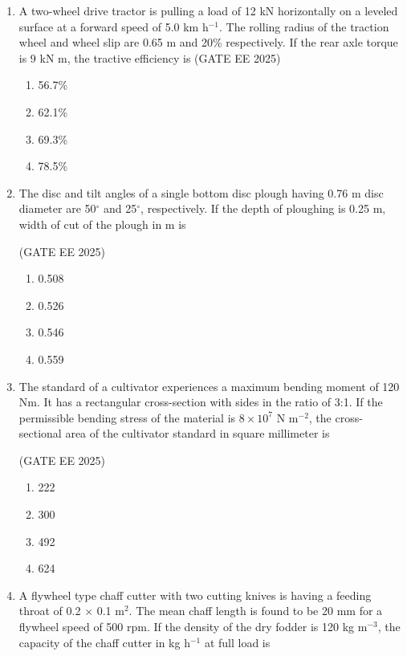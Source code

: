 \documentclass[journal,12pt,onecolumn]{IEEEtran}
\theoremstyle{remark}
\begin{document}
\begin{enumerate}
\item A two-wheel drive tractor is pulling a load of 12 kN horizontally on a leveled surface at a forward speed of 5.0 km h$^{-1}$. The rolling radius of the traction wheel and wheel slip are 0.65 m and 20\% respectively. If the rear axle torque is 9 kN m, the tractive efficiency is
\hfill(GATE EE 2025)
\begin{multicols}{4}
\begin{enumerate}
    \item 56.7\%
    \item 62.1\%
    \item 69.3\%
    \item 78.5\%
\end{enumerate}
\end{multicols}
\newpage
\item The disc and tilt angles of a single bottom disc plough having 0.76 m disc diameter are 50$^\circ$ and 25$^\circ$, respectively. If the depth of ploughing is 0.25 m, width of cut
of the plough in m is

\hfill(GATE EE 2025)

\begin{multicols}{4}
\begin{enumerate}
    \item 0.508
    \item 0.526
    \item 0.546
    \item 0.559
\end{enumerate}
\end{multicols}

\item The standard of a cultivator experiences a maximum bending moment of 120 Nm. It has a rectangular cross-section with sides in the ratio of 3:1. If the permissible bending stress of the material is $8 \times 10^{7}$ N m$^{-2}$, the cross-sectional area of the cultivator standard in square millimeter is

\hfill(GATE EE 2025)

\begin{multicols}{4}
\begin{enumerate}
    \item 222
    \item 300
    \item 492
    \item 624
\end{enumerate}
\end{multicols}

\item A flywheel type chaff cutter with two cutting knives is having a feeding throat of 0.2 $\times$ 0.1 m$^{2}$. The mean chaff length is found to be 20 mm for a flywheel speed of 
500 rpm. If the density of the dry fodder is 120 kg m$^{-3}$, the capacity of the chaff cutter in kg h$^{-1}$ at full load is


\end{enumerate}
\end{document}

